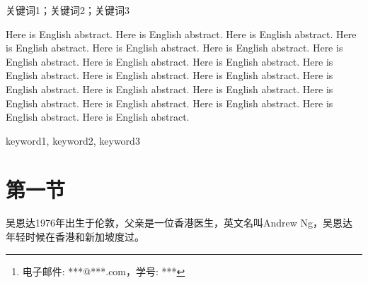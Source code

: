 \documentclass[a4paper, 12pt, centering]{article}
\begin{document}
\title{}
\author{\footnote{电子邮件: ***@***.com，学号: ***}\\[2ex]
\sanhao 浙江大学工程师学院\\[2ex]
}
\date{\sanhao\today}
\maketitle



\begin{abstract}
这里是摘要这里是摘要这里是摘要这里是摘要这里是摘要这里是摘要这里是摘要这里是摘要这里是摘要这里是摘要这里是摘要这里是摘要这里是摘要这里是摘要这里是摘要这里是摘要这里是摘要这里是摘要这里是摘要这里是摘要这里是摘要这里是摘要这里是摘要这里是摘要这里是摘要这里是摘要这里是摘要这里是摘要这里是摘要这里是摘要这里是摘要这里是摘要这里是摘要这里是摘要这里是摘要这里是摘要这里是摘要这里是摘要这里是摘要这里是摘要这里是摘要这里是摘要这里是摘要这里是摘要
\end{abstract}

\begin{keys}
关键词1；关键词2；关键词3
\end{keys}

\begin{enabstract}
Here is English abstract. Here is English abstract. Here is English abstract. Here is English abstract. Here is English abstract. Here is English abstract. Here is English abstract. Here is English abstract. Here is English abstract. Here is English abstract. Here is English abstract. Here is English abstract. Here is English abstract. Here is English abstract. Here is English abstract. Here is English abstract. Here is English abstract. Here is English abstract. Here is English abstract. Here is English abstract.
\end{enabstract}

\begin{enkeys}
keyword1, keyword2, keyword3
\end{enkeys}
\newpage

\tableofcontents
\newpage

\section{第一节}
吴恩达1976年出生于伦敦，父亲是一位香港医生，英文名叫Andrew Ng，吴恩达年轻时候在香港和新加坡度过。
\end{document}
